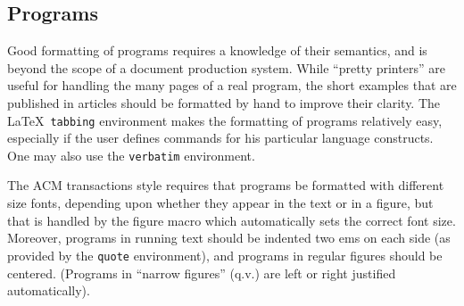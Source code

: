 \documentclass[acmtocl]{acmtrans2m}
\begin{document}
\subsection{Programs}

Good formatting of programs requires a knowledge of their semantics,
and is beyond the scope of a document production system.  While
``pretty printers'' are useful for handling the many pages of a real
program, the short examples that are published in articles should be
formatted by hand to improve their clarity.  The \LaTeX\ {\tt tabbing}
environment makes the formatting of programs relatively easy,
especially if the user defines commands for his particular language
constructs.
One may also use the {\tt verbatim} environment.

The ACM transactions style requires that programs be formatted with
different size fonts, depending upon whether they appear in the text 
or
in a figure, but that is handled by the figure macro which
automatically sets the correct font size.
Moreover, programs in running text should be indented two ems 
on each side (as provided by the {\tt quote} environment), and
programs in regular figures should be centered.
(Programs in ``narrow figures'' (q.v.) are left or right justified
automatically).
\end{document}
